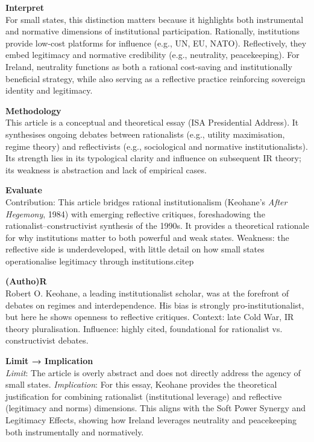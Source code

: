 \textbf{Interpret} \\
For small states, this distinction matters because it highlights both instrumental and normative dimensions of institutional participation. Rationally, institutions provide low-cost platforms for influence (e.g., UN, EU, NATO). Reflectively, they embed legitimacy and normative credibility (e.g., neutrality, peacekeeping). For Ireland, neutrality functions as both a rational cost-saving and institutionally beneficial strategy, while also serving as a reflective practice reinforcing sovereign identity and legitimacy.

\textbf{Methodology} \\
This article is a conceptual and theoretical essay (ISA Presidential Address). It synthesises ongoing debates between rationalists (e.g., utility maximisation, regime theory) and reflectivists (e.g., sociological and normative institutionalists). Its strength lies in its typological clarity and influence on subsequent IR theory; its weakness is abstraction and lack of empirical cases.

\textbf{Evaluate} \\
Contribution: This article bridges rational institutionalism (Keohane’s \textit{After Hegemony}, 1984) with emerging reflective critiques, foreshadowing the rationalist–constructivist synthesis of the 1990s. It provides a theoretical rationale for why institutions matter to both powerful and weak states. Weakness: the reflective side is underdeveloped, with little detail on how small states operationalise legitimacy through institutions.citep

\textbf{(Autho)R} \\
Robert O. Keohane, a leading institutionalist scholar, was at the forefront of debates on regimes and interdependence. His bias is strongly pro-institutionalist, but here he shows openness to reflective critiques. Context: late Cold War, IR theory pluralisation. Influence: highly cited, foundational for rationalist vs. constructivist debates.

\textbf{Limit → Implication} \\
\textit{Limit}: The article is overly abstract and does not directly address the agency of small states.  
\textit{Implication}: For this essay, Keohane provides the theoretical justification for combining rationalist (institutional leverage) and reflective (legitimacy and norms) dimensions. This aligns with the Soft Power Synergy and Legitimacy Effects, showing how Ireland leverages neutrality and peacekeeping both instrumentally and normatively.

